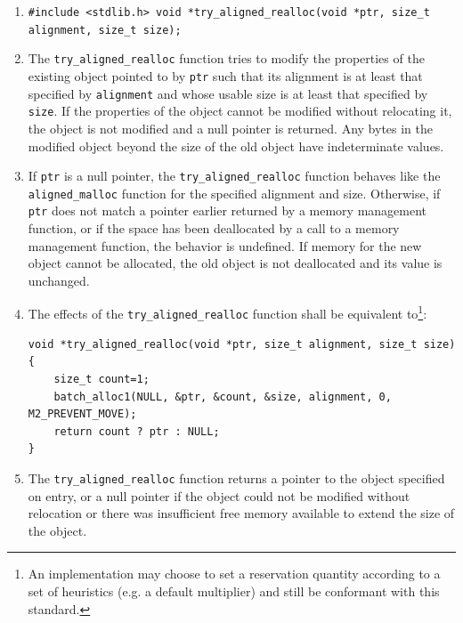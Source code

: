 \documentclass[wd]{isov2}
\begin{document}
{\color{changed}
\begin{enumerate}
\renewcommand{\theenumi}{\arabic{enumi}}
\item \texttt{\#include <stdlib.h>\linebreak
void *try\_aligned\_realloc(void *ptr, size\_t alignment, size\_t size);}
\item The \texttt{try\_aligned\_realloc} function tries to modify the properties of the existing object pointed to by \texttt{ptr} such that its alignment is at least that specified by \texttt{alignment} and whose usable size is at least that specified by \texttt{size}. If the properties of the object cannot be modified without relocating it, the object is not modified and a null pointer is returned. Any bytes in the modified object beyond the size of the old object have indeterminate values.
\item If \texttt{ptr} is a null pointer, the \texttt{try\_aligned\_realloc} function behaves like the \texttt{aligned\_malloc} function for the specified alignment and size. Otherwise, if \texttt{ptr} does not match a pointer earlier returned by a memory management function, or if the space has been deallocated by a call to a memory management function, the behavior is undefined. If memory for the new object cannot be allocated, the old object is not deallocated and its value is unchanged.
\color{changed}
\item The effects of the \texttt{try\_aligned\_realloc} function shall be equivalent to\footnote{An implementation may choose to set a reservation quantity according to a set of heuristics (e.g. a default multiplier) and still be conformant with this standard.}:
\begin{verbatim}
void *try_aligned_realloc(void *ptr, size_t alignment, size_t size)
{
    size_t count=1;
    batch_alloc1(NULL, &ptr, &count, &size, alignment, 0, M2_PREVENT_MOVE);
    return count ? ptr : NULL;
}
\end{verbatim}
\item The \texttt{try\_aligned\_realloc} function returns a pointer to the object specified on entry, or a null pointer if the object could not be modified without relocation or there was insufficient free memory available to extend the size of the object.
\end{enumerate}

}
\end{document}
